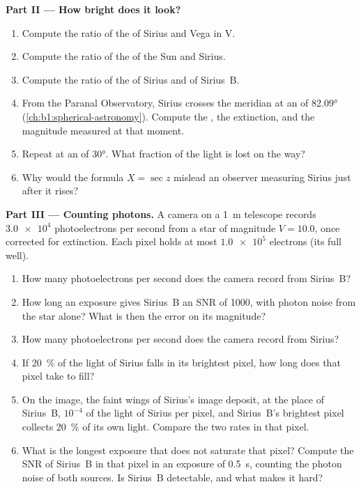 \begin{problem}
\medskip
\noindent\textbf{Part II --- How bright does it look?}
\begin{enumerate}[resume]
  \item Compute the ratio of the  of Sirius and Vega in V.
  \item Compute the ratio of the  of the Sun and Sirius.
  \item Compute the ratio of the  of Sirius and of Sirius~B.
  \item From the Paranal Observatory, Sirius crosses the meridian at an
         of \ang{82.09} (\cref{ch:b1:spherical-astronomy}). Compute
        the , the extinction, and the magnitude measured at that
        moment.
  \item Repeat at an  of \ang{30}. What fraction of the light is lost
        on the way?
  \item Why would the formula $X = \sec z$ mislead an observer measuring
        Sirius just after it rises?
\end{enumerate}

\medskip
\noindent\textbf{Part III --- Counting photons.}
A camera on a \qty{1}{m} telescope records $\num{3.0e4}$ photoelectrons per
second from a star of magnitude $V = 10.0$, once corrected for extinction.
Each pixel holds at most $\num{1.0e5}$ electrons (its full well).
\begin{enumerate}[resume]
  \item How many photoelectrons per second does the camera record from
        Sirius~B?
  \item How long an exposure gives Sirius~B an SNR of 1000, with photon
        noise from the star alone? What is then the error on its magnitude?
  \item How many photoelectrons per second does the camera record from
        Sirius?
  \item If \qty{20}{\percent} of the light of Sirius falls in its brightest
        pixel, how long does that pixel take to fill?
  \item On the image, the faint wings of Sirius's image deposit, at the
        place of Sirius~B, $10^{-4}$ of the light of Sirius per pixel, and
        Sirius~B's brightest pixel collects \qty{20}{\percent} of its own
        light. Compare the two rates in that pixel.
  \item What is the longest exposure that does not saturate that pixel?
        Compute the SNR of Sirius~B in that pixel in an exposure of
        \qty{0.5}{s}, counting the photon noise of both sources. Is Sirius~B
        detectable, and what makes it hard?
\end{enumerate}


\end{problem}

